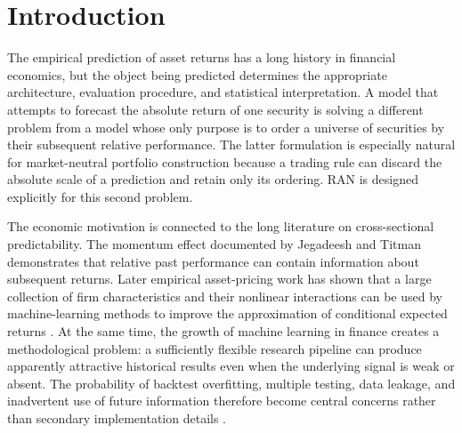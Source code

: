 \documentclass[10pt]{article}
\begin{document}
\begin{abstract}
The results provide evidence that the complete RAN pipeline produces a positive cross-sectional ranking signal in the supplied development period. They do not, however, establish that the graph component is responsible for that performance: the no-graph ablation is statistically close to the full model at ten and twenty sessions. Nor do they establish post-2023 out-of-sample performance, because the supplied archive contains the development stage but not the configured frozen final-stage results. The paper therefore treats RAN as a reproducible empirical research system and identifies the untouched holdout, point-in-time universe construction, and more realistic execution modeling as necessary subsequent tests.
\end{abstract}

\section{Introduction}

The empirical prediction of asset returns has a long history in financial economics, but the object being predicted determines the appropriate architecture, evaluation procedure, and statistical interpretation. A model that attempts to forecast the absolute return of one security is solving a different problem from a model whose only purpose is to order a universe of securities by their subsequent relative performance. The latter formulation is especially natural for market-neutral portfolio construction because a trading rule can discard the absolute scale of a prediction and retain only its ordering. RAN is designed explicitly for this second problem.

The economic motivation is connected to the long literature on cross-sectional predictability. The momentum effect documented by Jegadeesh and Titman \citep{jegadeesh1993} demonstrates that relative past performance can contain information about subsequent returns. Later empirical asset-pricing work has shown that a large collection of firm characteristics and their nonlinear interactions can be used by machine-learning methods to improve the approximation of conditional expected returns \citep{gu2020}. At the same time, the growth of machine learning in finance creates a methodological problem: a sufficiently flexible research pipeline can produce apparently attractive historical results even when the underlying signal is weak or absent. The probability of backtest overfitting, multiple testing, data leakage, and inadvertent use of future information therefore become central concerns rather than secondary implementation details \citep{bailey2017}.
\end{document}
